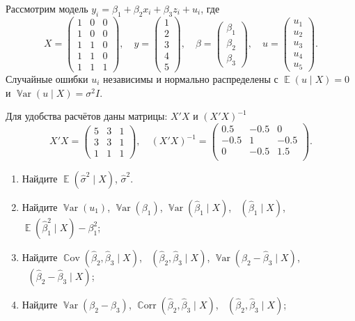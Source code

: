 \documentclass[12pt]{article}
\DeclareMathOperator{\Cov}{\mathbb{C}ov}
\DeclareMathOperator{\Corr}{\mathbb{C}orr}
\DeclareMathOperator{\Var}{\mathbb{V}ar}
\DeclareMathOperator{\hVar}{\widehat{\Var}}
\DeclareMathOperator{\hCov}{\widehat{\Cov}}
\DeclareMathOperator{\hCorr}{\widehat{\Corr}}
\DeclareMathOperator{\E}{\mathbb{E}}
\newcommand{\hb}{\hat{\beta}}
\newcommand{\hs}{\hat{\sigma}}
\begin{document}
\begin{problem}
Рассмотрим модель $y_i = \beta_1 + \beta_2 x_i + \beta_3 z_i + u_i$, 
 где
\[
X = \begin{pmatrix} 
  1 & 0 & 0 \\ 
  1 & 0 & 0 \\ 
  1 & 1 & 0 \\ 
  1 & 1 & 0 \\ 
  1 & 1 & 1 
\end{pmatrix}, \quad
y = \begin{pmatrix} 1 \\ 2 \\ 3 \\ 4 \\ 5 \end{pmatrix}, \quad
\beta = \begin{pmatrix} \beta_1 \\ \beta_2 \\ \beta_3 \end{pmatrix}, \quad
u = \begin{pmatrix} u_1 \\ u_2 \\ u_3 \\ u_4 \\ u_5  \end{pmatrix}.
\]
Случайные ошибки $u_i$ независимы и нормально распределены с
$\E(u \mid X) = 0$ и $\Var(u \mid X) = \sigma^2 I$. 

Для удобства расчётов даны матрицы: $X'X$ и $(X'X)^{-1}$ 
\[
X'X = \begin{pmatrix} 
  5 & 3 & 1 \\ 
  3 & 3 & 1\\ 
  1 & 1 & 1 
\end{pmatrix}, \quad
(X' X)^{-1} =  \begin{pmatrix}
  0.5 & -0.5 & 0 \\
  -0.5 & 1 & -0.5 \\
  0 & -0.5 & 1.5 \\
  \end{pmatrix}.
\]


\begin{enumerate}
\item Найдите $\E (\hs^2 \mid X)$, $\hs^2$.
\item Найдите  $\Var (u_1)$, $\Var (\beta_1)$, $\Var (\hb_1 \mid X)$, $\hVar(\hb_1 \mid X)$, $\E (\hb_1^2 \mid X) - \beta_1^2$;
\item Найдите  $\Cov (\hb_2, \hb_3 \mid X)$, $\hCov(\hb_2, \hb_3 \mid X)$, $\Var (\hb_2 - \hb_3 \mid X)$, $\hVar(\hb_2 - \hb_3 \mid X)$;
\item Найдите  $\Var (\beta_2 - \beta_3)$, $\Corr (\hb_2, \hb_3 \mid X)$, $\hCorr(\hb_2, \hb_3 \mid X)$;
\end{enumerate}



\end{problem}
\end{document}
